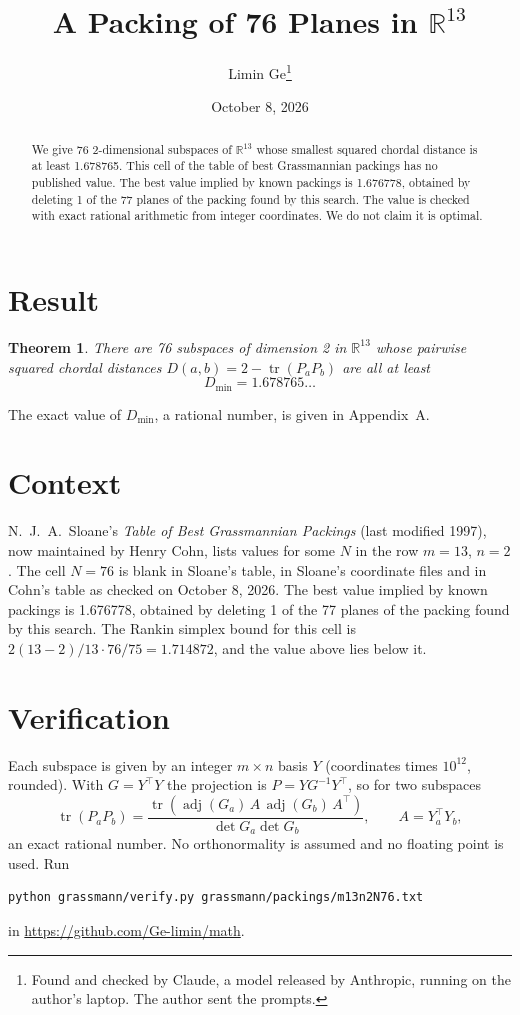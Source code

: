 \documentclass[11pt,a4paper]{article}
\title{A Packing of 76 Planes in $\mathbb{R}^{13}$}
\author{Limin Ge\thanks{Found and checked by Claude, a model released by Anthropic, running on the author's laptop. The author sent the prompts.}}
\date{October 8, 2026}
\newtheorem*{theorem}{Theorem}
\begin{document}
\maketitle
\begin{abstract}
We give 76 2-dimensional subspaces of $\mathbb{R}^{13}$ whose smallest squared chordal distance is at least 1.678765. This cell of the table of best Grassmannian packings has no published value. The best value implied by known packings is 1.676778, obtained by deleting 1 of the 77 planes of the packing found by this search. The value is checked with exact rational arithmetic from integer coordinates. We do not claim it is optimal.
\end{abstract}

\section{Result}
\begin{theorem}
There are 76 subspaces of dimension 2 in $\mathbb{R}^{13}$ whose pairwise squared chordal distances $D(a,b) = 2 - \operatorname{tr}(P_aP_b)$ are all at least
\[ D_{\min} = 1.678765\ldots \]
\end{theorem}
The exact value of $D_{\min}$, a rational number, is given in Appendix~A.


\section{Context}
N.~J.~A.~Sloane's \emph{Table of Best Grassmannian Packings} (last modified 1997), now maintained by Henry Cohn, lists values for some $N$ in the row $m=13$, $n=2$. The cell $N=76$ is blank in Sloane's table, in Sloane's coordinate files and in Cohn's table as checked on October 8, 2026. The best value implied by known packings is 1.676778, obtained by deleting 1 of the 77 planes of the packing found by this search. The Rankin simplex bound for this cell is $2(13-2)/13\cdot 76/75 = 1.714872$, and the value above lies below it.


\section{Verification}
Each subspace is given by an integer $m\times n$ basis $Y$ (coordinates times $10^{12}$, rounded). With $G=Y^\top Y$ the projection is $P=YG^{-1}Y^\top$, so for two subspaces
\[ \operatorname{tr}(P_aP_b)=\frac{\operatorname{tr}(\operatorname{adj}(G_a)\,A\,\operatorname{adj}(G_b)\,A^\top)}{\det G_a\det G_b},\qquad A=Y_a^\top Y_b, \]
an exact rational number. No orthonormality is assumed and no floating point is used. Run
\begin{verbatim}
python grassmann/verify.py grassmann/packings/m13n2N76.txt
\end{verbatim}
in \url{https://github.com/Ge-limin/math}.
\end{document}
